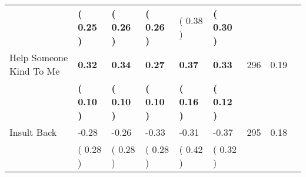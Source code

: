 \begin{tabular}{L{6.2cm} C{1.8cm} C{1.8cm} C{1.8cm} C{1.8cm} C{1.8cm} C{1.8cm} C{0.3cm} C{0.3cm}}
 & \textbf{(     0.25 )} & \textbf{(     0.26 )} & \textbf{(     0.26 )} & (     0.38 ) & \textbf{(     0.30 )}  & \\
Help Someone Kind To Me & \textbf{     0.32} & \textbf{     0.34} & \textbf{     0.27} & \textbf{     0.37} & \textbf{     0.33}  & 296 &       0.19 \\ 
 & \textbf{(     0.10 )} & \textbf{(     0.10 )} & \textbf{(     0.10 )} & \textbf{(     0.16 )} & \textbf{(     0.12 )}  & \\
Insult Back &     -0.28 &     -0.26 &     -0.33 &     -0.31 &     -0.37  & 295 &       0.18 \\ 
 & (     0.28 ) & (     0.28 ) & (     0.28 ) & (     0.42 ) & (     0.32 )  & \\
\bottomrule
\end{tabular}
